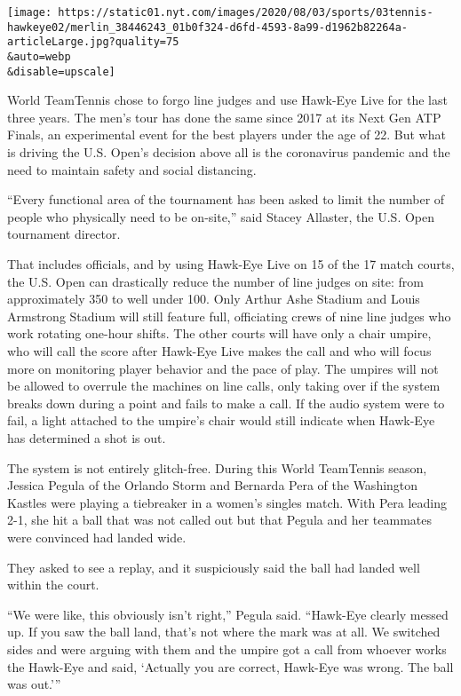 \texttt{[image: https://static01.nyt.com/images/2020/08/03/sports/03tennis-hawkeye02/merlin\_38446243\_01b0f324-d6fd-4593-8a99-d1962b82264a-articleLarge.jpg?quality=75\\\&auto=webp\\\&disable=upscale]}

World TeamTennis chose to forgo line judges and use Hawk-Eye Live for
the last three years. The men's tour has done the same since 2017 at its
Next Gen ATP Finals, an experimental event for the best players under
the age of 22. But what is driving the U.S. Open's decision above all is
the coronavirus pandemic and the need to maintain safety and social
distancing.

``Every functional area of the tournament has been asked to limit the
number of people who physically need to be on-site,'' said Stacey
Allaster, the U.S. Open tournament director.

That includes officials, and by using Hawk-Eye Live on 15 of the 17
match courts, the U.S. Open can drastically reduce the number of line
judges on site: from approximately 350 to well under 100. Only Arthur
Ashe Stadium and Louis Armstrong Stadium will still feature full,
officiating crews of nine line judges who work rotating one-hour shifts.
The other courts will have only a chair umpire, who will call the score
after Hawk-Eye Live makes the call and who will focus more on monitoring
player behavior and the pace of play. The umpires will not be allowed to
overrule the machines on line calls, only taking over if the system
breaks down during a point and fails to make a call. If the audio system
were to fail, a light attached to the umpire's chair would still
indicate when Hawk-Eye has determined a shot is out.

The system is not entirely glitch-free. During this World TeamTennis
season, Jessica Pegula of the Orlando Storm and Bernarda Pera of the
Washington Kastles were playing a tiebreaker in a women's singles match.
With Pera leading 2-1, she hit a ball that was not called out but that
Pegula and her teammates were convinced had landed wide.

They asked to see a replay, and it suspiciously said the ball had landed
well within the court.

``We were like, this obviously isn't right,'' Pegula said. ``Hawk-Eye
clearly messed up. If you saw the ball land, that's not where the mark
was at all. We switched sides and were arguing with them and the umpire
got a call from whoever works the Hawk-Eye and said, `Actually you are
correct, Hawk-Eye was wrong. The ball was out.'''

